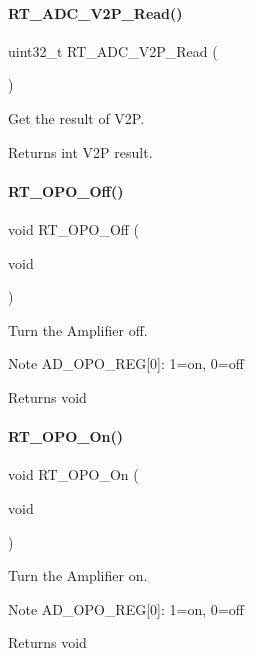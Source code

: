 \paragraph{\texorpdfstring{R\+T\+\_\+\+A\+D\+C\+\_\+\+V2\+P\+\_\+\+Read()}{RT\_ADC\_V2P\_Read()}}
{\footnotesize\ttfamily uint32\+\_\+t R\+T\+\_\+\+A\+D\+C\+\_\+\+V2\+P\+\_\+\+Read (\begin{DoxyParamCaption}{ }\end{DoxyParamCaption})}



Get the result of V2P. 

\begin{DoxyReturn}{Returns}
int V2P result. 
\end{DoxyReturn}
\mbox{\label{a00002_ad981e76e736802e0d75c93aa87239c21}} 
\paragraph{\texorpdfstring{R\+T\+\_\+\+O\+P\+O\+\_\+\+Off()}{RT\_OPO\_Off()}}
{\footnotesize\ttfamily void R\+T\+\_\+\+O\+P\+O\+\_\+\+Off (\begin{DoxyParamCaption}\item[{void}]{ }\end{DoxyParamCaption})}



Turn the Amplifier off. 

\begin{DoxyNote}{Note}
A\+D\+\_\+\+O\+P\+O\+\_\+\+R\+EG\mbox{[}0\mbox{]}\+: 1=on, 0=off 
\end{DoxyNote}
\begin{DoxyReturn}{Returns}
void 
\end{DoxyReturn}
\mbox{\label{a00002_a6304dd2bf95eefdafda9caa159beafdc}} 
\paragraph{\texorpdfstring{R\+T\+\_\+\+O\+P\+O\+\_\+\+On()}{RT\_OPO\_On()}}
{\footnotesize\ttfamily void R\+T\+\_\+\+O\+P\+O\+\_\+\+On (\begin{DoxyParamCaption}\item[{void}]{ }\end{DoxyParamCaption})}



Turn the Amplifier on. 

\begin{DoxyNote}{Note}
A\+D\+\_\+\+O\+P\+O\+\_\+\+R\+EG\mbox{[}0\mbox{]}\+: 1=on, 0=off 
\end{DoxyNote}
\begin{DoxyReturn}{Returns}
void 
\end{DoxyReturn}
